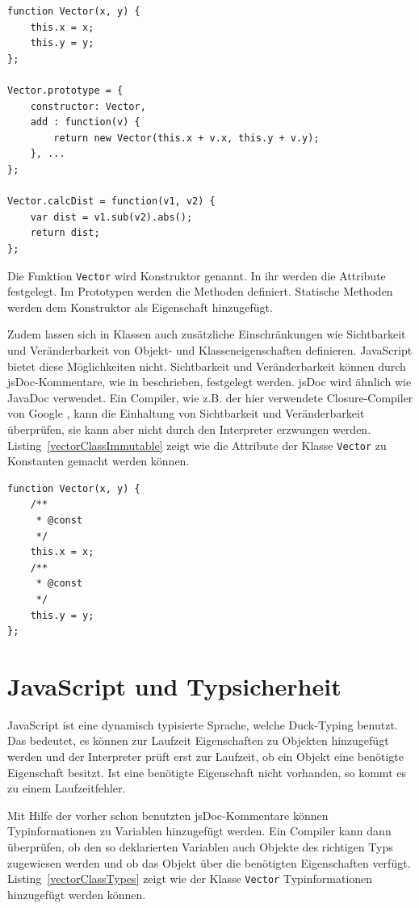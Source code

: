 \begin{lstlisting}[float = htbp, caption={Eine Vektor-Klasse},label=vectorClass]
function Vector(x, y) {
    this.x = x;
    this.y = y;    
};

Vector.prototype = {
    constructor: Vector,
    add : function(v) {
        return new Vector(this.x + v.x, this.y + v.y);
    }, ...
};

Vector.calcDist = function(v1, v2) {
    var dist = v1.sub(v2).abs();
    return dist;
};
\end{lstlisting}

Die Funktion \verb+Vector+ wird Konstruktor genannt. In ihr werden die Attribute festgelegt. Im Prototypen werden die Methoden definiert. Statische Methoden werden dem Konstruktor als Eigenschaft hinzugefügt.

Zudem lassen sich in Klassen auch zusätzliche Einschränkungen wie Sichtbarkeit und Veränderbarkeit von Objekt- und Klasseneigenschaften definieren. JavaScript bietet diese Möglichkeiten nicht. Sichtbarkeit und Veränderbarkeit können durch jsDoc-Kommentare, wie in \autocite{useJsDoc} beschrieben, festgelegt werden. jsDoc wird ähnlich wie JavaDoc verwendet. Ein Compiler, wie z.B. der hier verwendete Closure-Compiler von Google \autocite{closureTools}, kann die Einhaltung von Sichtbarkeit und Veränderbarkeit überprüfen, sie kann aber nicht durch den Interpreter erzwungen werden. Listing~\ref{vectorClassImmutable} zeigt wie die Attribute der Klasse \verb+Vector+ zu Konstanten gemacht werden können.

\begin{lstlisting}[float = htbp, caption={Eine Vektor-Klasse mit konstanten Attributen},label=vectorClassImmutable]
function Vector(x, y) {
    /**
     * @const
     */
    this.x = x;
    /**
     * @const
     */
    this.y = y;    
};
\end{lstlisting}

\section*{JavaScript und Typsicherheit}

JavaScript ist eine dynamisch typisierte Sprache, welche Duck-Typing benutzt. Das bedeutet, es können zur Laufzeit Eigenschaften zu Objekten hinzugefügt werden und der Interpreter prüft erst zur Laufzeit, ob ein Objekt eine benötigte Eigenschaft besitzt. Ist eine benötigte Eigenschaft nicht vorhanden, so kommt es zu einem Laufzeitfehler.

Mit Hilfe der vorher schon benutzten jsDoc-Kommentare können Typinformationen zu Variablen hinzugefügt werden. Ein Compiler kann dann überprüfen, ob den so deklarierten Variablen auch Objekte des richtigen Typs zugewiesen werden und ob das Objekt über die benötigten Eigenschaften verfügt. Listing~\ref{vectorClassTypes} zeigt wie der Klasse \verb+Vector+ Typinformationen hinzugefügt werden können.

